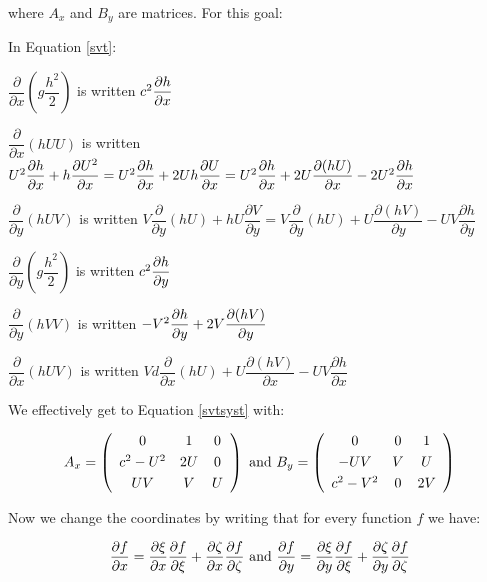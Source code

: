 where $A_{x}$ and $B_{y}$ are matrices. For this goal:

In Equation \ref{svt}:

$\dfrac{\partial }{\partial x}(g\dfrac{h^{2}}{2})$ is written $c^{2}\dfrac{%
\partial h}{\partial x}$

$\dfrac{\partial }{\partial x}(hUU)$ is written $U^{2}\dfrac{\partial h}{%
\partial x}+h\dfrac{\partial U^{2}}{\partial x}=U^{2}\dfrac{\partial h}{%
\partial x}+2Uh\dfrac{\partial U}{\partial x}=U^{2}\dfrac{\partial h}{\partial
x}+2U\dfrac{\partial (hU)}{\partial x}-2U^{2}\dfrac{\partial h}{\partial x}$

$\dfrac{\partial }{\partial y}(hUV)$ is written $V\dfrac{\partial }{\partial y}%
(hU)+hU\dfrac{\partial V}{\partial y}=V\dfrac{\partial }{\partial y}(hU)+U%
\dfrac{\partial (hV)}{\partial y}-UV\dfrac{\partial h}{\partial y}$

$\dfrac{\partial }{\partial y}(g\dfrac{h^{2}}{2})$ is written $c^{2}\dfrac{%
\partial h}{\partial y}$

$\dfrac{\partial }{\partial y}(hVV)$ is written $-V^{2}\dfrac{\partial h}{%
\partial y}+2V\dfrac{\partial (hV)}{\partial y}$

$\dfrac{\partial }{\partial x}(hUV)$ is written $Vd\dfrac{\partial }{\partial x}%
(hU)+U\dfrac{\partial (hV)}{\partial x}-UV\dfrac{\partial h}{\partial x}$

We effectively get to Equation \ref{svtsyst} with:

\begin{equation}
A_{x}=\left( 
\begin{array}{ccc}
0 & 1 & 0 \smallskip\\ 
c^{2}-U^{2} & 2U & 0 \smallskip\\ 
UV & V & U%
\end{array}
\right) \text{ and }B_{y}=\left( 
\begin{array}{ccc}
0 & 0 & 1 \smallskip\\ 
-UV & V & U \smallskip\\ 
c^{2}-V^{2} & 0 & 2V%
\end{array}
\right)
\end{equation}

Now we change the coordinates by writing that for every function $f$ we have:

\begin{equation*}
\dfrac{\partial f}{\partial x}=\dfrac{\partial \xi }{\partial x}\dfrac{%
\partial f}{\partial \xi }+\dfrac{\partial \zeta }{\partial x}\dfrac{\partial
f}{\partial \zeta }\text{ and }\dfrac{\partial f}{\partial y}=\dfrac{\partial
\xi }{\partial y}\dfrac{\partial f}{\partial \xi }+\dfrac{\partial \zeta }{%
\partial y}\dfrac{\partial f}{\partial \zeta }
\end{equation*}

